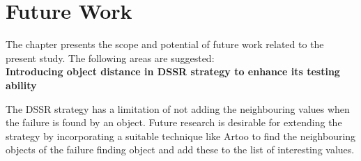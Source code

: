 
\chapter{Future Work}
\label{chap:futureWork}
The chapter presents the scope and potential of future work related to the present study. The following areas are suggested:\\


	
\textbf{Introducing object distance in DSSR strategy to enhance its testing ability}

The DSSR strategy has a limitation of not adding the neighbouring values when the failure is found by an object. Future research is desirable for extending the strategy by incorporating a suitable technique like Artoo to find the neighbouring objects of the failure finding object and add these to the list of interesting values.  


